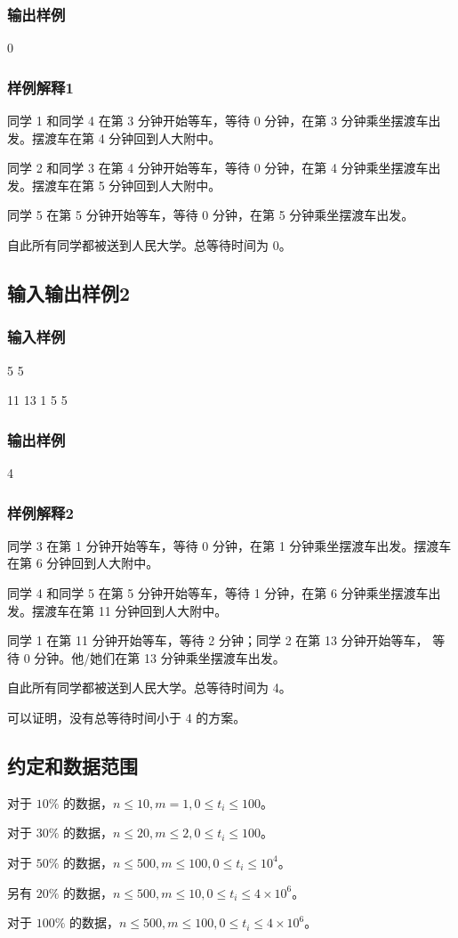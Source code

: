 \documentclass[UTF8]{ctexart}
\begin{document}
\subsubsection{输出样例}

0

\subsubsection{样例解释1}

同学 1 和同学 4 在第 3 分钟开始等车，等待 0 分钟，在第 3 分钟乘坐摆渡车出发。摆渡车在第 4 分钟回到人大附中。

同学 2 和同学 3 在第 4 分钟开始等车，等待 0 分钟，在第 4 分钟乘坐摆渡车出发。摆渡车在第 5 分钟回到人大附中。

同学 5 在第 5 分钟开始等车，等待 0 分钟，在第 5 分钟乘坐摆渡车出发。

自此所有同学都被送到人民大学。总等待时间为 0。

\subsection{输入输出样例2}
\subsubsection{输入样例}

5 5 

11 13 1 5 5 

\subsubsection{输出样例}

4

\subsubsection{样例解释2}

同学 3 在第 1 分钟开始等车，等待 0 分钟，在第 1 分钟乘坐摆渡车出发。摆渡车在第 6 分钟回到人大附中。

同学 4 和同学 5 在第 5 分钟开始等车，等待 1 分钟，在第 6 分钟乘坐摆渡车出发。摆渡车在第 11 分钟回到人大附中。

同学 1 在第 11 分钟开始等车，等待 2 分钟；同学 2 在第 13 分钟开始等车， 等待 0 分钟。他/她们在第 13 分钟乘坐摆渡车出发。

自此所有同学都被送到人民大学。总等待时间为 4。

可以证明，没有总等待时间小于 4 的方案。

\subsection{约定和数据范围}

对于 $10\%$ 的数据，$n\le 10,m=1,0\le t_i\le 100$。

对于 $30\%$ 的数据，$n\le 20,m\le 2,0\le t_i\le 100$。

对于 $50\%$ 的数据，$n\le 500,m\le 100,0\le t_i\le 10^4$。

另有 $20\%$ 的数据，$n\le 500,m\le 10,0\le t_i\le 4\times 10^6$。

对于 $100\%$ 的数据，$n\le 500,m\le 100,0\le t_i\le 4\times 10^6$。 
\end{document}
